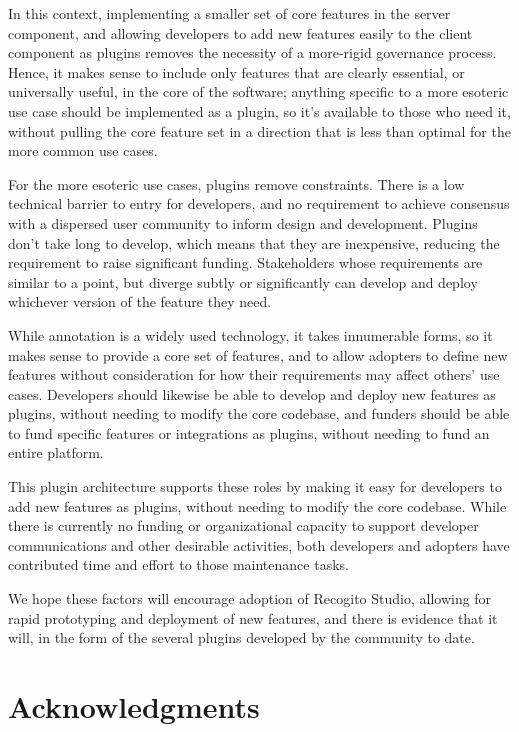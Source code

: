 \documentclass[final]{anthology-ch}         %
\begin{document}
  In this context,  implementing a smaller set of core features in the server component, and allowing developers to add new features easily to the client component as plugins removes the necessity of a more-rigid governance process. Hence, it makes sense to include only features that are clearly essential, or universally useful, in the core of the software; anything specific to a more esoteric use case should be implemented as a plugin, so it's available to those who need it, without pulling the core feature set in a direction that is less than optimal for the more common use cases.

  For the more esoteric use cases, plugins remove constraints. There is a low technical barrier to entry for developers, and no requirement to achieve consensus with a dispersed user community to inform design and development. Plugins don't take long to develop, which means that they are inexpensive, reducing the requirement to raise significant funding. Stakeholders whose requirements are similar to a point, but diverge subtly or significantly can develop and deploy whichever version of the feature they need.
  
  While annotation is a widely used technology, it takes innumerable forms, so it makes sense to provide a core set of features, and to allow adopters to define new features without consideration for how their requirements may affect others' use cases. Developers should likewise be able to develop and deploy new features as plugins, without needing to modify the core codebase, and funders should be able to fund specific features or integrations as plugins, without needing to fund an entire platform.

  This plugin architecture supports these roles by making it easy for developers to add new features as plugins, without needing to modify the core codebase. While there is currently no funding or organizational capacity to support developer communications and other desirable activities, both developers and adopters have contributed time and effort to those maintenance tasks.

We hope these factors will encourage adoption of Recogito Studio, allowing for rapid prototyping and deployment of new features, and there is evidence that it will, in the form of the several plugins developed by the community to date.

\section*{Acknowledgments}
\end{document}
